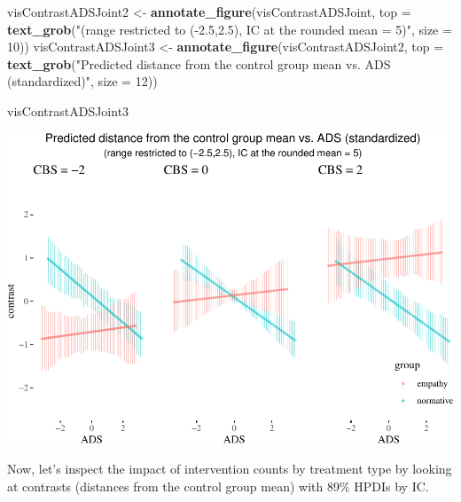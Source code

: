 \documentclass[10pt,dvipsnames,enabledeprecatedfontcommands]{scrartcl}
\newenvironment{Shaded}{\begin{snugshade}}{\end{snugshade}}
\newcommand{\KeywordTok}[1]{\textcolor[rgb]{0.13,0.29,0.53}{\textbf{#1}}}
\newcommand{\DataTypeTok}[1]{\textcolor[rgb]{0.13,0.29,0.53}{#1}}
\newcommand{\DecValTok}[1]{\textcolor[rgb]{0.00,0.00,0.81}{#1}}
\newcommand{\StringTok}[1]{\textcolor[rgb]{0.31,0.60,0.02}{#1}}
\newcommand{\NormalTok}[1]{#1}
\begin{document}
\begin{Shaded}
\begin{Highlighting}[]
\NormalTok{visContrastADSJoint2 <-}\StringTok{ }\KeywordTok{annotate_figure}\NormalTok{(visContrastADSJoint, }
\DataTypeTok{top =} \KeywordTok{text_grob}\NormalTok{(}\StringTok{"(range restricted to (-2.5,2.5), IC at the rounded mean = 5)"}\NormalTok{,}
                                                        \DataTypeTok{size =} \DecValTok{10}\NormalTok{))}
\NormalTok{visContrastADSJoint3 <-}\StringTok{ }\KeywordTok{annotate_figure}\NormalTok{(visContrastADSJoint2, }
\DataTypeTok{top =} \KeywordTok{text_grob}\NormalTok{(}\StringTok{"Predicted distance from the control group mean vs. ADS (standardized)"}\NormalTok{,}
                                                        \DataTypeTok{size =} \DecValTok{12}\NormalTok{))}

\NormalTok{visContrastADSJoint3}
\end{Highlighting}
\end{Shaded}

\begin{center}\includegraphics[width=1\linewidth]{bayesianReport_files/figure-latex/unnamed-chunk-16-1} \end{center}

\normalsize

Now, let's inspect the impact of intervention counts by treatment type
by looking at contrasts (distances from the control group mean) with
89\% HPDIs by IC.

\vspace{1mm} \footnotesize
\end{document}
